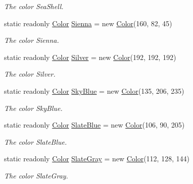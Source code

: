 \begin{DoxyCompactItemize}
\begin{DoxyCompactList}\small\item\em The color Sea\-Shell. \end{DoxyCompactList}\item 
static readonly \hyperlink{struct_tri_devs_1_1_tri_engine_1_1_color}{Color} \hyperlink{struct_tri_devs_1_1_tri_engine_1_1_color_a63557c668e0c06554f99dd7282256fd9}{Sienna} = new \hyperlink{struct_tri_devs_1_1_tri_engine_1_1_color}{Color}(160, 82, 45)
\begin{DoxyCompactList}\small\item\em The color Sienna. \end{DoxyCompactList}\item 
static readonly \hyperlink{struct_tri_devs_1_1_tri_engine_1_1_color}{Color} \hyperlink{struct_tri_devs_1_1_tri_engine_1_1_color_acce920046813f5f9fb06f9a6aba476b2}{Silver} = new \hyperlink{struct_tri_devs_1_1_tri_engine_1_1_color}{Color}(192, 192, 192)
\begin{DoxyCompactList}\small\item\em The color Silver. \end{DoxyCompactList}\item 
static readonly \hyperlink{struct_tri_devs_1_1_tri_engine_1_1_color}{Color} \hyperlink{struct_tri_devs_1_1_tri_engine_1_1_color_a9ae4a5831908291149a4c09784f7df02}{Sky\-Blue} = new \hyperlink{struct_tri_devs_1_1_tri_engine_1_1_color}{Color}(135, 206, 235)
\begin{DoxyCompactList}\small\item\em The color Sky\-Blue. \end{DoxyCompactList}\item 
static readonly \hyperlink{struct_tri_devs_1_1_tri_engine_1_1_color}{Color} \hyperlink{struct_tri_devs_1_1_tri_engine_1_1_color_a4ce3d60e05af27d36f63bb649b35f450}{Slate\-Blue} = new \hyperlink{struct_tri_devs_1_1_tri_engine_1_1_color}{Color}(106, 90, 205)
\begin{DoxyCompactList}\small\item\em The color Slate\-Blue. \end{DoxyCompactList}\item 
static readonly \hyperlink{struct_tri_devs_1_1_tri_engine_1_1_color}{Color} \hyperlink{struct_tri_devs_1_1_tri_engine_1_1_color_ad3b559bbb73fc42197df506f1da9140f}{Slate\-Gray} = new \hyperlink{struct_tri_devs_1_1_tri_engine_1_1_color}{Color}(112, 128, 144)
\begin{DoxyCompactList}\small\item\em The color Slate\-Gray. \end{DoxyCompactList}\item 

\end{DoxyCompactItemize}
